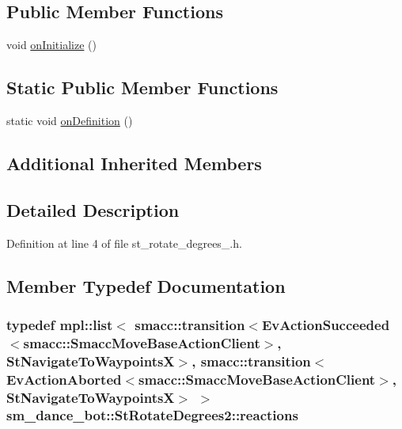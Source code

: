 \subsection*{Public Member Functions}
\begin{DoxyCompactItemize}
\item 
void \hyperlink{structsm__dance__bot_1_1StRotateDegrees2_af85e79274e57e0a4ccf50845bac9edc9}{on\+Initialize} ()
\end{DoxyCompactItemize}
\subsection*{Static Public Member Functions}
\begin{DoxyCompactItemize}
\item 
static void \hyperlink{structsm__dance__bot_1_1StRotateDegrees2_aebb0e8217cca3669331f049a1382ea4e}{on\+Definition} ()
\end{DoxyCompactItemize}
\subsection*{Additional Inherited Members}


\subsection{Detailed Description}


Definition at line 4 of file st\+\_\+rotate\+\_\+degrees\+\_.\+h.



\subsection{Member Typedef Documentation}
\subsubsection[{\texorpdfstring{reactions}{reactions}}]{\setlength{\rightskip}{0pt plus 5cm}typedef mpl\+::list$<$ {\bf smacc\+::transition}$<$Ev\+Action\+Succeeded$<${\bf smacc\+::\+Smacc\+Move\+Base\+Action\+Client}$>$, {\bf St\+Navigate\+To\+WaypointsX}$>$, {\bf smacc\+::transition}$<$Ev\+Action\+Aborted$<${\bf smacc\+::\+Smacc\+Move\+Base\+Action\+Client}$>$, {\bf St\+Navigate\+To\+WaypointsX}$>$ $>$ {\bf sm\+\_\+dance\+\_\+bot\+::\+St\+Rotate\+Degrees2\+::reactions}}\hypertarget{structsm__dance__bot_1_1StRotateDegrees2_aa01d5d48614bf376f1f2f21fb5464c42}{}\label{structsm__dance__bot_1_1StRotateDegrees2_aa01d5d48614bf376f1f2f21fb5464c42}


